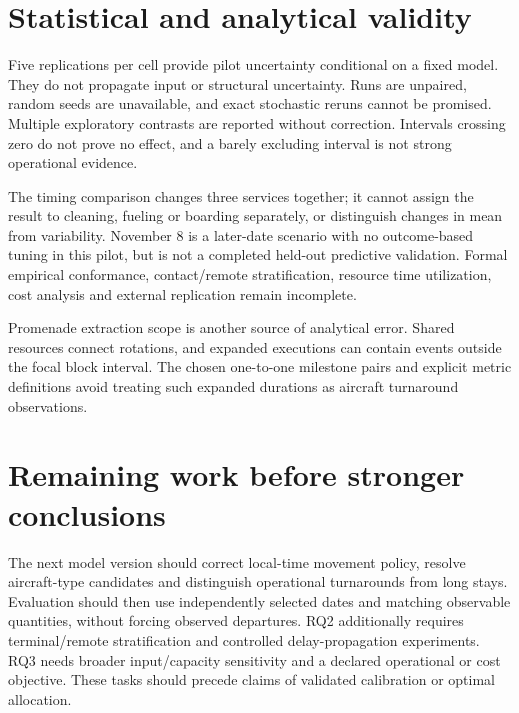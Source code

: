 \section{Statistical and analytical validity}
Five replications per cell provide pilot uncertainty conditional on a fixed model. They do not propagate input or structural uncertainty. Runs are unpaired, random seeds are unavailable, and exact stochastic reruns cannot be promised. Multiple exploratory contrasts are reported without correction. Intervals crossing zero do not prove no effect, and a barely excluding interval is not strong operational evidence.

The timing comparison changes three services together; it cannot assign the result to cleaning, fueling or boarding separately, or distinguish changes in mean from variability. November 8 is a later-date scenario with no outcome-based tuning in this pilot, but is not a completed held-out predictive validation. Formal empirical conformance, contact/remote stratification, resource time utilization, cost analysis and external replication remain incomplete.

Promenade extraction scope is another source of analytical error. Shared resources connect rotations, and expanded executions can contain events outside the focal block interval. The chosen one-to-one milestone pairs and explicit metric definitions avoid treating such expanded durations as aircraft turnaround observations.

\section{Remaining work before stronger conclusions}
The next model version should correct local-time movement policy, resolve aircraft-type candidates and distinguish operational turnarounds from long stays. Evaluation should then use independently selected dates and matching observable quantities, without forcing observed departures. RQ2 additionally requires terminal/remote stratification and controlled delay-propagation experiments. RQ3 needs broader input/capacity sensitivity and a declared operational or cost objective. These tasks should precede claims of validated calibration or optimal allocation.
